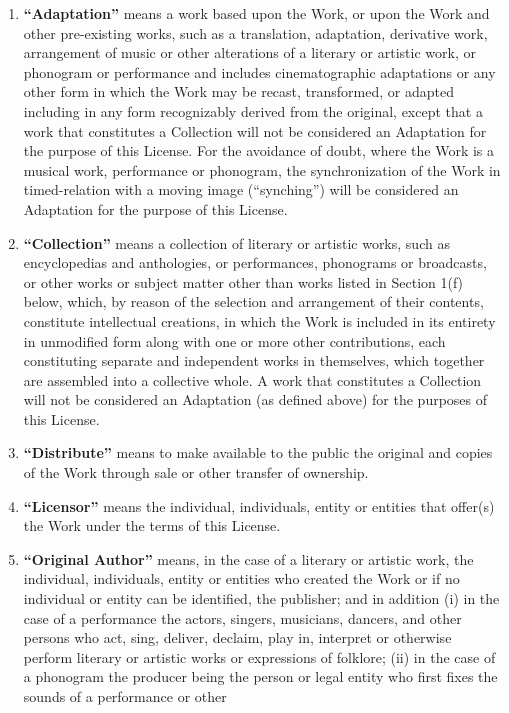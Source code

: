 \begin{enumerate}
\item \textbf{``Adaptation''} means a work based upon
the Work, or upon the Work and other pre-existing works,
such as a translation, adaptation, derivative work,
arrangement of music or other alterations of a literary
or artistic work, or phonogram or performance and
includes cinematographic adaptations or any other form in
which the Work may be recast, transformed, or adapted
including in any form recognizably derived from the
original, except that a work that constitutes a
Collection will not be considered an Adaptation for the
purpose of this License. For the avoidance of doubt,
where the Work is a musical work, performance or
phonogram, the synchronization of the Work in
timed-relation with a moving image (``synching'') will be
considered an Adaptation for the purpose of this
License.
\item \textbf{``Collection''} means a collection of
literary or artistic works, such as encyclopedias and
anthologies, or performances, phonograms or broadcasts,
or other works or subject matter other than works listed
in Section 1(f) below, which, by reason of the selection
and arrangement of their contents, constitute
intellectual creations, in which the Work is included in
its entirety in unmodified form along with one or more
other contributions, each constituting separate and
independent works in themselves, which together are
assembled into a collective whole. A work that
constitutes a Collection will not be considered an
Adaptation (as defined above) for the purposes of this
License.
\item \textbf{``Distribute''} means to make available
to the public the original and copies of the Work through
sale or other transfer of ownership.
\item \textbf{``Licensor''} means the individual,
individuals, entity or entities that offer(s) the Work
under the terms of this License.
\item \textbf{``Original Author''} means, in the case
of a literary or artistic work, the individual,
individuals, entity or entities who created the Work or
if no individual or entity can be identified, the
publisher; and in addition (i) in the case of a
performance the actors, singers, musicians, dancers, and
other persons who act, sing, deliver, declaim, play in,
interpret or otherwise perform literary or artistic works
or expressions of folklore; (ii) in the case of a
phonogram the producer being the person or legal entity
who first fixes the sounds of a performance or other

\end{enumerate}

